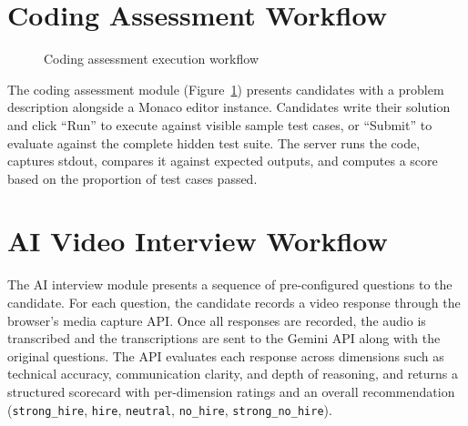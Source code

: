 \section{Coding Assessment Workflow}
\label{sec:coding-workflow}

\begin{figure}[htbp]
\centering
{}
\caption{Coding assessment execution workflow}
\label{fig:coding-flow}
\end{figure}

The coding assessment module (Figure~\ref{fig:coding-flow}) presents candidates with a problem description alongside a Monaco editor instance. Candidates write their solution and click ``Run'' to execute against visible sample test cases, or ``Submit'' to evaluate against the complete hidden test suite. The server runs the code, captures stdout, compares it against expected outputs, and computes a score based on the proportion of test cases passed.

\section{AI Video Interview Workflow}
\label{sec:interview-workflow}

The AI interview module presents a sequence of pre-configured questions to the candidate. For each question, the candidate records a video response through the browser's media capture API. Once all responses are recorded, the audio is transcribed and the transcriptions are sent to the Gemini API along with the original questions. The API evaluates each response across dimensions such as technical accuracy, communication clarity, and depth of reasoning, and returns a structured scorecard with per-dimension ratings and an overall recommendation (\texttt{strong\_hire}, \texttt{hire}, \texttt{neutral}, \texttt{no\_hire}, \texttt{strong\_no\_hire}).

